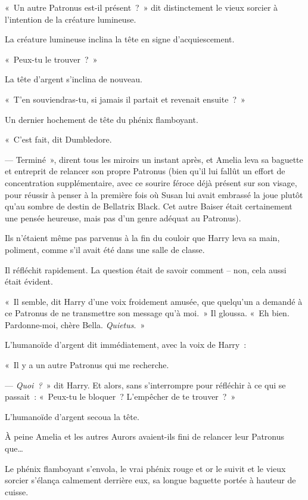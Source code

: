 «~Un autre Patronus est-il présent~?~» dit distinctement le vieux sorcier à l'intention de la créature lumineuse.

La créature lumineuse inclina la tête en signe d'acquiescement.

«~Peux-tu le trouver~?~»

La tête d'argent s'inclina de nouveau.

«~T'en souviendras-tu, si jamais il partait et revenait ensuite~?~»

Un dernier hochement de tête du phénix flamboyant.

«~C'est fait, dit Dumbledore.

--- Terminé~», dirent tous les miroirs un instant après, et Amelia leva sa baguette et entreprit de relancer son propre Patronus (bien qu'il lui fallût un effort de concentration supplémentaire, avec ce sourire féroce déjà présent sur son visage, pour réussir à penser à la première fois où Susan lui avait embrassé la joue plutôt qu'au sombre de destin de Bellatrix Black. Cet autre Baiser était certainement une pensée heureuse, mais pas d'un genre adéquat au Patronus).

\later

Ils n'étaient même pas parvenus à la fin du couloir que Harry leva sa main, poliment, comme s'il avait été dans une salle de classe.

Il réfléchit rapidement. La question était de savoir comment -- non, cela aussi était évident.

«~Il semble, dit Harry d'une voix froidement amusée, que quelqu'un a demandé à ce Patronus de ne transmettre son message qu'à moi.~» Il gloussa. «~Eh bien. Pardonne-moi, chère Bella. \emph{Quietus}.~»

L'humanoïde d'argent dit immédiatement, avec la voix de Harry~:

«~Il y a un autre Patronus qui me recherche.

--- \emph{Quoi~?}~» dit Harry. Et alors, sans s'interrompre pour réfléchir à ce qui se passait~: «~Peux-tu le bloquer~? L'empêcher de te trouver~?~»

L'humanoïde d'argent secoua la tête.

\later

À peine Amelia et les autres Aurors avaient-ils fini de relancer leur Patronus que…

Le phénix flamboyant s'envola, le vrai phénix rouge et or le suivit et le vieux sorcier s'élança calmement derrière eux, sa longue baguette portée à hauteur de cuisse.

